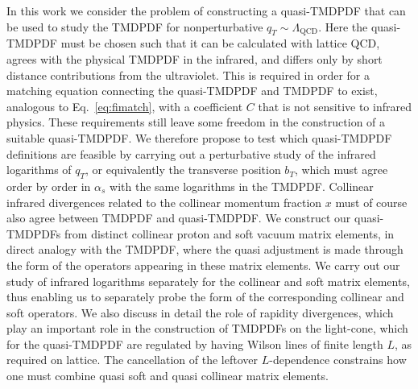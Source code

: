 \documentclass[11pt,a4paper]{article}
\DeclareRobustCommand{\eq}[1]{Eq.~\eqref{eq:#1}}
\newcommand{\LQCD}{\Lambda_\mathrm{QCD}}
\begin{document}
In this work we consider the problem of constructing a quasi-TMDPDF that can be used to study the TMDPDF for nonperturbative $q_T\sim \LQCD$. Here the quasi-TMDPDF must be chosen such that it can be calculated with lattice QCD, agrees with the physical TMDPDF in the infrared, and differs only by short distance contributions from the ultraviolet.
This is required in order for a matching equation connecting the quasi-TMDPDF and TMDPDF to exist, analogous to \eq{fimatch}, with a coefficient $C$ that is not sensitive to infrared physics. These requirements still leave some freedom in the construction of a suitable quasi-TMDPDF.
We therefore propose to test which quasi-TMDPDF definitions are feasible by carrying out a perturbative study of the infrared logarithms of $q_T$, or equivalently the transverse position $b_T$, which must agree order by order in $\alpha_s$ with the same logarithms in the TMDPDF.
Collinear infrared divergences related to the collinear momentum fraction $x$ must
of course also agree between TMDPDF and quasi-TMDPDF.
We construct our quasi-TMDPDFs from distinct collinear proton and soft vacuum matrix elements, in direct analogy with the TMDPDF, where the quasi adjustment is made through the form of the operators appearing in these matrix elements. We carry out our study of infrared logarithms separately for the collinear and soft matrix elements, thus enabling us to separately probe the form of the corresponding collinear and soft operators.
We also discuss in detail the role of rapidity divergences,
which play an important role in the construction of TMDPDFs on the light-cone,
which for the quasi-TMDPDF are regulated by having Wilson lines of finite length $L$, as required on lattice. The cancellation of the leftover $L$-dependence constrains how one must combine quasi soft and quasi collinear matrix elements.
\end{document}
